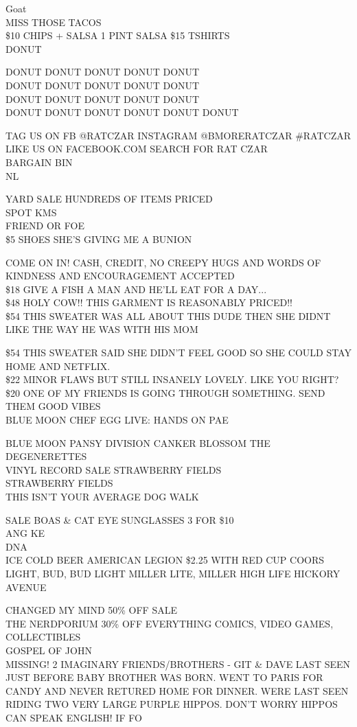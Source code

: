 \documentclass[10pt,letterpaper]{article}
\begin{document}
Goat\\
MISS THOSE TACOS\\
\$10 CHIPS + SALSA 1 PINT SALSA \$15 TSHIRTS\\
DONUT

DONUT DONUT DONUT DONUT DONUT\\
DONUT DONUT DONUT DONUT DONUT\\
DONUT DONUT DONUT DONUT DONUT\\
DONUT DONUT DONUT DONUT DONUT DONUT

TAG US ON FB @RATCZAR INSTAGRAM @BMORERATCZAR \#RATCZAR\\
LIKE US ON FACEBOOK.COM SEARCH FOR RAT CZAR\\
BARGAIN BIN\\
NL

YARD SALE HUNDREDS OF ITEMS PRICED\\
SPOT KMS\\
FRIEND OR FOE\\
\$5 SHOES SHE'S GIVING ME A BUNION

COME ON IN!  CASH, CREDIT, NO CREEPY HUGS AND WORDS OF KINDNESS AND ENCOURAGEMENT ACCEPTED\\
\$18 GIVE A FISH A MAN AND HE'LL EAT FOR A DAY...\\
\$48 HOLY COW!! THIS GARMENT IS REASONABLY PRICED!!\\
\$54 THIS SWEATER WAS ALL ABOUT THIS DUDE THEN SHE DIDNT LIKE THE WAY HE WAS WITH HIS MOM

\$54 THIS SWEATER SAID SHE DIDN'T FEEL GOOD SO SHE COULD STAY HOME AND NETFLIX.\\
\$22 MINOR FLAWS BUT STILL INSANELY LOVELY.  LIKE YOU RIGHT?\\
\$20 ONE OF MY FRIENDS IS GOING THROUGH SOMETHING.  SEND THEM GOOD VIBES\\
BLUE MOON CHEF EGG LIVE: HANDS ON PAE

BLUE MOON PANSY DIVISION CANKER BLOSSOM THE DEGENERETTES\\
VINYL RECORD SALE STRAWBERRY FIELDS\\
STRAWBERRY FIELDS\\
THIS ISN'T YOUR AVERAGE DOG WALK

SALE BOAS \& CAT EYE SUNGLASSES 3 FOR \$10\\
ANG KE\\
DNA\\
ICE COLD BEER AMERICAN LEGION \$2.25 WITH RED CUP COORS LIGHT, BUD, BUD LIGHT MILLER LITE, MILLER HIGH LIFE HICKORY AVENUE

CHANGED MY MIND 50\% OFF SALE\\
THE NERDPORIUM 30\% OFF EVERYTHING COMICS, VIDEO GAMES, COLLECTIBLES\\
GOSPEL OF JOHN\\
MISSING!  2 IMAGINARY FRIENDS/BROTHERS {-} GIT \& DAVE LAST SEEN JUST BEFORE BABY BROTHER WAS BORN.  WENT TO PARIS FOR CANDY AND NEVER RETURED HOME FOR DINNER.  WERE LAST SEEN RIDING TWO VERY LARGE PURPLE HIPPOS.  DON'T WORRY HIPPOS CAN SPEAK ENGLISH!  IF FO
\end{document}
